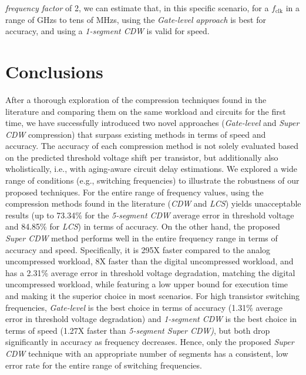 \textit{frequency factor} of 2, we can estimate that, in this specific scenario, for a $f_\text{clk}$ in a range of GHzs to tens of MHzs, using the \textit{Gate-level approach} is best for accuracy, and using a \textit{1-segment CDW} is valid for speed. 





\section{Conclusions}
\label{section:Conclusions}

After a thorough exploration of the compression techniques found in the literature and comparing them on the same workload and circuits for the first time, we have successfully introduced two novel approaches (\textit{Gate-level} and \textit{Super CDW} compression) that surpass existing methods in terms of speed and accuracy. The accuracy of each compression method is not solely evaluated based on the predicted threshold voltage shift per transistor, but additionally also wholistically, i.e., with aging-aware circuit delay estimations. We explored a wide range of conditions (e.g., switching frequencies) to illustrate the robustness of our proposed techniques. For the entire range of frequency values, using the compression methods found in the literature (\textit{CDW} and \textit{LCS}) yields unacceptable results (up to 73.34\% for the \textit{5-segment CDW} average error in threshold voltage and 84.85\% for \textit{LCS}) in terms of accuracy. On the other hand, the proposed \textit{Super CDW} method performs well in the entire frequency range in terms of accuracy and speed. Specifically, it is 295X faster compared to the analog uncompressed workload, 8X faster than the digital uncompressed workload, and has a 2.31\% average error in threshold voltage degradation, matching the digital uncompressed workload, while featuring a low upper bound for execution time and making it the superior choice in most scenarios. For high transistor switching frequencies, \textit{Gate-level} is the best choice in terms of accuracy (1.31\% average error in threshold voltage degradation) and \textit{1-segment CDW} is the best choice in terms of speed (1.27X faster than \textit{5-segment Super CDW)}, but both drop significantly in accuracy as frequency decreases. Hence, only the proposed \textit{Super CDW} technique with an appropriate number of segments has a consistent, low error rate for the entire range of switching frequencies.


